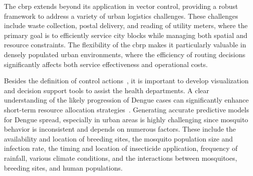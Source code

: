 The \gls{cbrp} extends beyond its application in vector control, providing a
robust framework to address a variety of urban logistics challenges. These
challenges include waste collection, postal delivery, and reading of utility
meters, where the primary goal is to efficiently service city blocks while
managing both spatial and resource constraints. The flexibility of the
\gls{cbrp} makes it particularly valuable in densely populated urban
environments, where the efficiency of routing decisions significantly affects
both service effectiveness and operational costs.


Besides the definition of control actions~\citep{gomez-2009,jing2019dengue}, it
is important to develop visualization and decision support tools to assist the
health departments. A clear understanding of the likely progression of Dengue
cases can significantly enhance short-term resource allocation
strategies~\citep{brasil-dept-helth:2009}. Generating accurate predictive models
for Dengue spread, especially in urban areas is highly challenging since
mosquito behavior is inconsistent and depends on numerous factors. These include
the availability and location of breeding sites, the mosquito population size
and infection rate, the timing and location of insecticide application,
frequency of rainfall, various climate conditions, and the interactions between
mosquitoes, breeding sites, and human populations.

